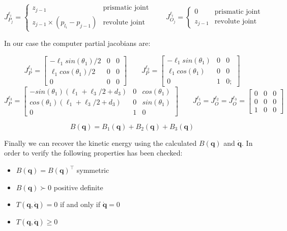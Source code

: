 \documentclass[a4paper,12pt]{article}
\renewcommand*{\l}{\ell}
\newcommand*{\q}{\bm{q}}
\newcommand*{\dotq}{\dot{\q}}
\begin{document}
\[
    J^{\l_i}_{P_j} = \begin{cases}
       z_{j-1} & \text{prismatic joint} \\
       z_{j-1} \times (p_{l_i}- p_{j-1}) & \text{revolute joint} 
      \end{cases}
    \qquad
    J^{\l_i}_{O_j} = \begin{cases}
    0 & \text{prismatic joint} \\
    z_{j-1} & \text{revolute joint} 
    \end{cases}
\]

\noindent In our case the computer partial jacobians are:

\[
    J^{\l_1}_{P} = \begin{bmatrix}
        -\l_1sin(\theta_1)/2 & 0 & 0 \\
 \l_1cos(\theta_1)/2 &0 &0 \\
               0 &0 &0
    \end{bmatrix}
    \qquad
    J^{\l_2}_{P} = \begin{bmatrix}
        - \l_1sin(\theta_1) &0 &0\\
\l_1cos(\theta_1) & 0 &0\\
                            0& 1& 0;
    \end{bmatrix}
\]
\[
    J^{\l_3}_{P} = \begin{bmatrix}
        -sin(\theta_1)(\l_1 + \l_3/2 + d_3) &0 & cos(\theta_1)\\
 cos(\theta_1)(\l_1 + \l_3/2 + d_3) &0 &sin(\theta_1)\\
                          0 &1 &      0
    \end{bmatrix}
    \qquad
    J^{\l_1}_{O} = J^{\l_2}_{O} = J^{\l_3}_{O} =\begin{bmatrix}
        0 &0 &0\\ 0& 0 &0\\ 1& 0& 0
    \end{bmatrix}
\]

\[
  B(\textbf{q}) = B_1(\textbf{q}) + B_2(\textbf{q}) +B_3(\textbf{q}) 
\]

\noindent Finally we can recover the kinetic energy using the calculated $B(\textbf{q})$ and $ \dot{\textbf{q}}$. In order to verify the following properties has been checked: 
\bigskip
\begin{itemize}
    \item $B(\q) = B(\q)^\top$ symmetric
    \item $B(\q) \succ 0$ positive definite
    \item $T(\q, \dotq) = 0$ if and only if $ \dotq = 0$
    \item $T(\q, \dotq) \geq 0$
\end{itemize}
\end{document}
